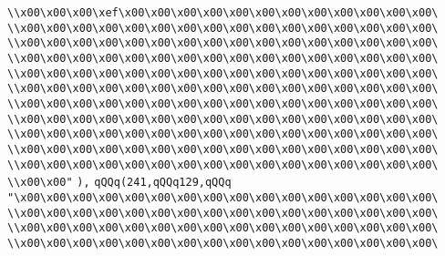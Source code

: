 \verb|\\x00\x00\x00\xef\x00\x00\x00\x00\x00\x00\x00\x00\x00\x00\x00\x00\|\newline
\verb|\\x00\x00\x00\x00\x00\x00\x00\x00\x00\x00\x00\x00\x00\x00\x00\x00\|\newline
\verb|\\x00\x00\x00\x00\x00\x00\x00\x00\x00\x00\x00\x00\x00\x00\x00\x00\|\newline
\verb|\\x00\x00\x00\x00\x00\x00\x00\x00\x00\x00\x00\x00\x00\x00\x00\x00\|\newline
\verb|\\x00\x00\x00\x00\x00\x00\x00\x00\x00\x00\x00\x00\x00\x00\x00\x00\|\newline
\verb|\\x00\x00\x00\x00\x00\x00\x00\x00\x00\x00\x00\x00\x00\x00\x00\x00\|\newline
\verb|\\x00\x00\x00\x00\x00\x00\x00\x00\x00\x00\x00\x00\x00\x00\x00\x00\|\newline
\verb|\\x00\x00\x00\x00\x00\x00\x00\x00\x00\x00\x00\x00\x00\x00\x00\x00\|\newline
\verb|\\x00\x00\x00\x00\x00\x00\x00\x00\x00\x00\x00\x00\x00\x00\x00\x00\|\newline
\verb|\\x00\x00\x00\x00\x00\x00\x00\x00\x00\x00\x00\x00\x00\x00\x00\x00\|\newline
\verb|\\x00\x00\x00\x00\x00\x00\x00\x00\x00\x00\x00\x00\x00\x00\x00\x00\|\newline
\verb|\\x00\x00"|\newline
\verb|),|\newline
\verb|qQQq(241,qQQq129,qQQq|\newline
\verb|"\x00\x00\x00\x00\x00\x00\x00\x00\x00\x00\x00\x00\x00\x00\x00\x00\|\newline
\verb|\\x00\x00\x00\x00\x00\x00\x00\x00\x00\x00\x00\x00\x00\x00\x00\x00\|\newline
\verb|\\x00\x00\x00\x00\x00\x00\x00\x00\x00\x00\x00\x00\x00\x00\x00\x00\|\newline
\verb|\\x00\x00\x00\x00\x00\x00\x00\x00\x00\x00\x00\x00\x00\x00\x00\x00\|\newline
